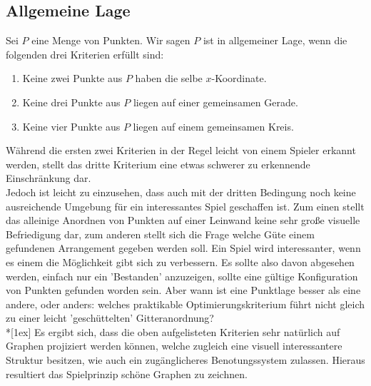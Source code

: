 \documentclass[a4paper,twocolumn]{scrartcl}
\begin{document}
\subsection{Allgemeine Lage}
\label{sec:Allgemeine_Lage}
Sei $P$ eine Menge von Punkten. Wir sagen $P$ ist in allgemeiner Lage, wenn die folgenden drei Kriterien erf\"ullt
sind:
\begin{enumerate}
  \item
    Keine zwei Punkte aus $P$ haben die selbe $x$-Koordinate.
  \item
    Keine drei Punkte aus $P$ liegen auf einer gemeinsamen Gerade.
  \item
    Keine vier Punkte aus $P$ liegen auf einem gemeinsamen Kreis.
\end{enumerate}
W\"ahrend die ersten zwei Kriterien in der Regel leicht von einem Spieler erkannt werden, stellt das dritte Kriterium
eine etwas schwerer zu erkennende Einschr\"ankung dar.\\
Jedoch ist leicht zu einzusehen, dass auch mit der dritten
Bedingung noch keine ausreichende Umgebung f\"ur ein interessantes Spiel geschaffen ist. Zum einen stellt das alleinige
Anordnen von Punkten auf einer Leinwand keine sehr gro\ss e visuelle Befriedigung dar, zum anderen stellt sich die Frage
welche G\"ute einem gefundenen Arrangement gegeben werden soll. Ein Spiel wird interessanter, wenn es einem die
M\"oglichkeit gibt sich zu verbessern. Es sollte also davon abgesehen werden, einfach nur ein 'Bestanden' anzuzeigen,
sollte eine g\"ultige Konfiguration von Punkten gefunden worden sein. Aber wann ist eine Punktlage besser als eine
andere, oder anders: welches praktikable Optimierungskriterium f\"uhrt nicht gleich zu einer leicht 'gesch\"uttelten' 
Gitteranordnung?\\*[1ex]
Es ergibt sich, dass  die oben aufgelisteten Kriterien sehr nat\"urlich auf Graphen projiziert werden k\"onnen, welche
zugleich eine visuell interessantere Struktur besitzen, wie auch ein zug\"anglicheres Benotungssystem zulassen. Hieraus
resultiert das Spielprinzip sch\"one Graphen zu zeichnen.
\end{document}
